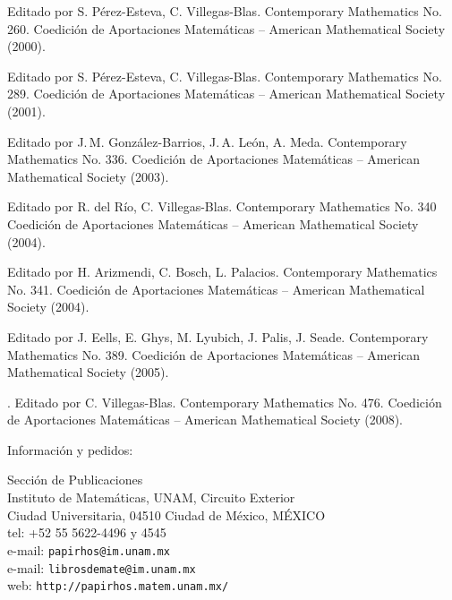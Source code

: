 Editado por S. Pérez-Esteva, C. Villegas-Blas. 
Contemporary Mathematics No. 260. 
Coedición de Aportaciones Matemáticas -- American Mathematical
Society (2000). %

Editado por S. Pérez-Esteva, C. Villegas-Blas. 
Contemporary Mathematics No. 289. 
Coedición de Aportaciones Matemáticas -- American Mathematical
Society (2001). %

Editado por J.\,M. González-Barrios, J.\,A. León, A. Meda. 
Contemporary Mathematics No. 336. 
Coedición de Aportaciones Matemáticas -- American Mathematical
Society (2003). %

Editado por R. del Río, C. Villegas-Blas.
Contemporary Mathematics No. 340
Coedición de Aportaciones Matemáticas -- American Mathematical
Society (2004). %

Editado por H. Arizmendi, C. Bosch, L. Palacios.
Contemporary Mathematics No. 341.
Coedición de Aportaciones Matemáticas -- American 
Mathematical Society (2004). %

Editado por J. Eells, E. Ghys, M. Lyubich, J. Palis,
  J. Seade. 
Contemporary Mathematics No. 389.
Coedición de Aportaciones Matemáticas -- American Mathematical
Society (2005). %

. 
Editado por C. Villegas-Blas. 
Contemporary Mathematics No. 476. 
Coedición de Aportaciones Matemáticas -- American Mathematical Society (2008).

\vskip15pt\vfill

\parbox{\linewidth}{Información y pedidos:

\vskip5pt
\begin{centering}
  Sección de Publicaciones\\
  Instituto de Matemáticas, UNAM, Circuito Exterior\\
  Ciudad Universitaria, 04510 Ciudad de México, MÉXICO\\
  tel: +52 55 5622-4496 y 4545\\
  e-mail: \texttt{papirhos@im.unam.mx}\\
  e-mail: \texttt{librosdemate@im.unam.mx}\\
  web: \texttt{http://papirhos.matem.unam.mx/}\\
\end{centering}}


